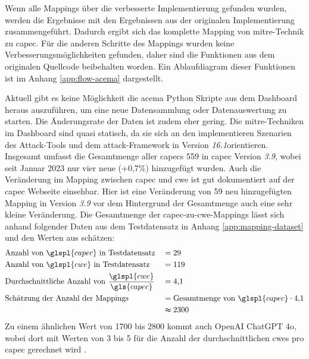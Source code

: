 Wenn alle Mappings über die verbesserte Implementierung gefunden wurden, werden die Ergebnisse mit den Ergebnissen aus der originalen Implementierung zusammengeführt. Dadurch ergibt sich das komplette Mapping von \gls{mitre}-Technik zu \gls{capec}. Für die anderen Schritte des Mappings wurden keine Verbesserungsmöglichkeiten gefunden, daher sind die Funktionen aus dem originalen Quellcode beibehalten worden. Ein Ablaufdiagram dieser Funktionen ist im Anhang \ref{app:flow-acema} dargestellt. 

Aktuell gibt es keine Möglichkeit die \gls{acema} Python Skripte aus dem Dashboard heraus auszuführen, um eine neue Datensammlung oder Datenauswertung zu starten. Die Änderungsrate der Daten ist zudem eher gering. Die \gls{mitre}-Techniken im Dashboard sind quasi statisch, da sie sich an den implementieren Szenarien des Attack-Tools und dem \gls{attack}-Framework in Version \textit{16.1}orientieren. Insgesamt umfasst die Gesamtmenge aller \glspl{capec} 559 in \gls{capec} Version \textit{3.9}, wobei seit Januar 2023 nur vier neue (+0,7\%) hinzugefügt wurden. Auch die Veränderung im Mapping zwischen \gls{capec} und \gls{cwe} ist gut dokumentiert auf der \gls{capec} Webseite einsehbar. Hier ist eine Veränderung von 59 neu hinzugefügten Mapping in Version \textit{3.9} vor dem Hintergrund der Gesamtmenge auch eine sehr kleine Veränderung. Die Gesamtmenge der \gls{capec}-zu-\gls{cwe}-Mappings lässt sich anhand folgender Daten aus dem Testdatensatz in Anhang \ref{app:mapping-dataset} und den Werten aus \autocite{CAPECNewsEvents} schätzen:
\[
    \begin{alignedat}{2}
         & \text{Anzahl von } \glspl{capec} \text{ in Testdatensatz}            & \quad & = 29             \\
         & \text{Anzahl von } \glspl{cwe} \text{ in Testdatensatz}              & \quad & = 119            \\
         & \text{Durchschnittliche Anzahl von } \frac{\glspl{cwe}}{\gls{capec}} & \quad & =
        4{,}1                                                                                              \\
         & \text{Schätzung der Anzahl der Mappings}                             & \quad & =
        \text{Gesamtmenge von } \glspl{capec} \cdot 4{,}1                                                 \\
         &                                                                      &       & \thickapprox2300 \\
    \end{alignedat}
\]
Zu einem ähnlichen Wert von 1700 bis 2800 kommt auch OpenAI ChatGPT 4o, wobei dort mit Werten von 3 bis 5 für die Anzahl der durchschnittlichen \glspl{cwe} pro \gls{capec} gerechnet wird \autocite{openaichatgpt4oCAPECCWEMapping2024}.

